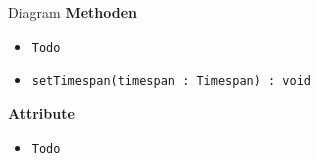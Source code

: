     \begin{Class}{Diagram}
        \textbf{Methoden}
        \begin{itemize}
            \item \texttt{Todo}
            \item \texttt{setTimespan(timespan : Timespan) : void}
        \end{itemize}
        
        \textbf{Attribute}
        \begin{itemize}
            \item \texttt{Todo}
        \end{itemize}
    \end{Class}

